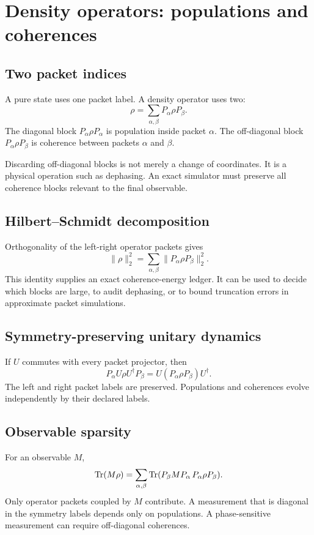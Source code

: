 \chapter{Density operators: populations and coherences}
\label{ch:density}

\section{Two packet indices}
A pure state uses one packet label. A density operator uses two:
\[
\rho
=
\sum_{\alpha,\beta}
P_\alpha\rho P_\beta.
\]
The diagonal block $P_\alpha\rho P_\alpha$ is population inside packet $\alpha$. The off-diagonal block $P_\alpha\rho P_\beta$ is coherence between packets $\alpha$ and $\beta$.

Discarding off-diagonal blocks is not merely a change of coordinates. It is a physical operation such as dephasing. An exact simulator must preserve all coherence blocks relevant to the final observable.

\section{Hilbert--Schmidt decomposition}
Orthogonality of the left-right operator packets gives
\[
\|\rho\|_2^2
=
\sum_{\alpha,\beta}
\|P_\alpha\rho P_\beta\|_2^2.
\]
This identity supplies an exact coherence-energy ledger. It can be used to decide which blocks are large, to audit dephasing, or to bound truncation errors in approximate packet simulations.

\section{Symmetry-preserving unitary dynamics}
If $U$ commutes with every packet projector, then
\[
P_\alpha U\rho U^\dagger P_\beta
=
U(P_\alpha\rho P_\beta)U^\dagger.
\]
The left and right packet labels are preserved. Populations and coherences evolve independently by their declared labels.

\section{Observable sparsity}
For an observable $M$,
\[
\operatorname{Tr}(M\rho)
=
\sum_{\alpha,\beta}
\operatorname{Tr}(P_\beta M P_\alpha\,P_\alpha\rho P_\beta).
\]
Only operator packets coupled by $M$ contribute. A measurement that is diagonal in the symmetry labels depends only on populations. A phase-sensitive measurement can require off-diagonal coherences.


